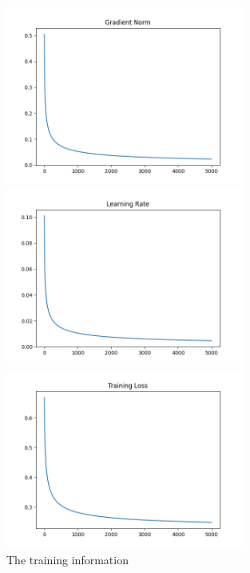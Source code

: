 \begin{figure}[htbp]
  \centerline{\includegraphics[width=0.7\textwidth]{../image/grad_norm.png}}
  \centerline{\includegraphics[width=0.7\textwidth]{../image/learning_rate.png}}
  \centerline{\includegraphics[width=0.7\textwidth]{../image/training_loss.png}}
  \caption{The training information}
  \label{fig:training}
\end{figure}

